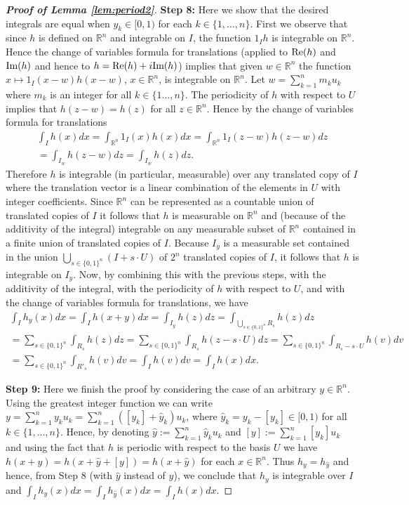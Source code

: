 \documentclass[12 pt]{amsart}
\theoremstyle{definition}
\newcommand{\R}{\mathbb{R}}
\newcommand{\re}{\textnormal{Re}}
\newcommand{\im}{\textnormal{Im}}
\newcommand{\bref}[1]{\textbf{\ref{#1}}} %
\begin{document}
\begin{proof}[{\bf Proof of Lemma \bref{lem:period2}}]
{\noindent \bf Step 8:} Here we show that the desired integrals are equal when $y_k\in [0,1)$ for each $k\in\{1,\ldots,n\}$. First we observe that since $h$ is defined on $\R^n$ and integrable on $I$, the function $1_I h$ is integrable on $\R^n$. Hence the change of variables formula for  translations \cite[p. 171]{Jones2001book} (applied to $\re(h)$ and $\im(h)$ and hence to $h=\re(h)+i\im(h)$) implies that given $w\in \R^n$ the function  $x\mapsto 1_I(x-w)h(x-w)$, $x\in \R^n$, is integrable on $\R^n$. Let $w=\sum_{k=1}^n m_ku_k$ where $m_k$ is an integer for all $k\in\{1\ldots,n\}$. The periodicity of $h$ with respect to $U$ implies that $h(z-w)=h(z)$ for all $z\in\R^n$. Hence by the change of variables formula for translations 
\begin{multline*} 
\int_{I}h(x)dx=\int_{\R^n}1_I(x)h(x)dx=\int_{\R^n}1_I(z-w)h(z-w)dz\\
=\int_{I_w}h(z-w)dz=\int_{I_w}h(z)dz. 
\end{multline*}
Therefore $h$ is integrable (in particular, measurable) over any translated copy of $I$ where the translation vector is a linear combination of the elements in $U$ with integer coefficients. Since $\R^n$ can be represented as a countable union of translated copies of $I$ it follows that $h$ is measurable on $\R^n$ and (because of the additivity of the integral) integrable on any measurable subset of $\R^n$ contained in a finite union of translated copies of $I$. Because $I_y$ is a measurable set  contained in the union $\bigcup_{s\in \{0,1\}^n}(I+s\cdot U)$ of $2^n$ translated copies of $I$, it follows that $h$ is integrable on $I_y$. Now, by  combining this with the previous steps, with the additivity of the integral, with the periodicity of $h$ with respect to $U$, and with the change of variables formula for translations, we have 
\begin{multline*}
\int_{I}h_y(x)dx=\int_{I}h(x+y)dx=\int_{I_y}h(z)dz=\int_{\bigcup_{s\in\{0,1\}^n}R_s}h(z)dz\\
=\sum_{s\in\{0,1\}^n}\int_{R_s}h(z)dz=\sum_{s\in\{0,1\}^n}\int_{R_s}h(z-s\cdot U)dz
=\sum_{s\in\{0,1\}^n}\int_{R_s-s\cdot U}h(v)dv\\
=\sum_{s\in\{0,1\}^n}\int_{R'_s}h(v)dv=\int_{I}h(v)dv=\int_I h(x)dx.
\end{multline*}

{\noindent \bf Step 9:} Here we finish the proof by considering the case of an arbitrary $y\in\R^n$. Using the greatest integer function we can write  $y=\sum_{k=1}^n y_k u_k=\sum_{k=1}^n ([y_k]+\hat{y}_k)u_k$, where $\hat{y}_k=y_k-[y_k]\in [0,1)$ for all $k\in \{1,\ldots,n\}$. Hence, by denoting $\hat{y}:=\sum_{k=1}^n\hat{y}_k u_k$ and $[y]:=\sum_{k=1}^n[y_k] u_k$ and using the fact that $h$ is periodic with respect to the basis $U$ we have $h(x+y)=h(x+\hat{y}+[y])=h(x+\hat{y})$ for each $x\in\R^n$. Thus $h_y=h_{\hat{y}}$ and hence, from Step 8 (with $\hat{y}$ instead of $y$), we conclude that $h_y$ is integrable over $I$ and $\int_{I}h_y(x)dx=\int_{I}h_{\hat{y}}(x)dx=\int_{I}h(x)dx$. 
\end{proof}
\end{document}
